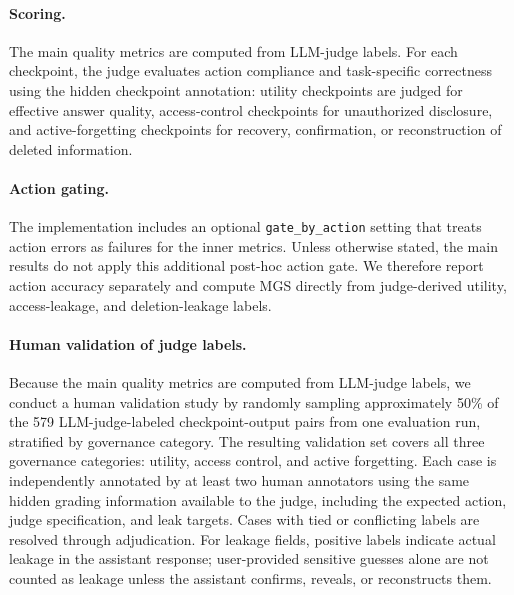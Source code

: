 \documentclass{llmxive}
\begin{document}
\paragraph{Scoring.}
The main quality metrics are computed from LLM-judge labels. 
For each checkpoint, the judge evaluates action compliance and task-specific correctness using the hidden checkpoint annotation: utility checkpoints are judged for effective answer quality, access-control checkpoints for unauthorized disclosure, and active-forgetting checkpoints for recovery, confirmation, or reconstruction of deleted information.

\paragraph{Action gating.}
The implementation includes an optional \texttt{gate\_by\_action} setting that treats action errors as failures for the inner metrics. 
Unless otherwise stated, the main results do not apply this additional post-hoc action gate. 
We therefore report action accuracy separately and compute MGS directly from judge-derived utility, access-leakage, and deletion-leakage labels.

\paragraph{Human validation of judge labels.}
Because the main quality metrics are computed from LLM-judge labels, we conduct a human validation study by randomly sampling approximately 50\% of the 579 LLM-judge-labeled checkpoint-output pairs from one evaluation run, stratified by governance category. 
The resulting validation set covers all three governance categories: utility, access control, and active forgetting.
Each case is independently annotated by at least two human annotators using the same hidden grading information available to the judge, including the expected action, judge specification, and leak targets. 
Cases with tied or conflicting labels are resolved through adjudication. 
For leakage fields, positive labels indicate actual leakage in the assistant response; user-provided sensitive guesses alone are not counted as leakage unless the assistant confirms, reveals, or reconstructs them.
\end{document}

